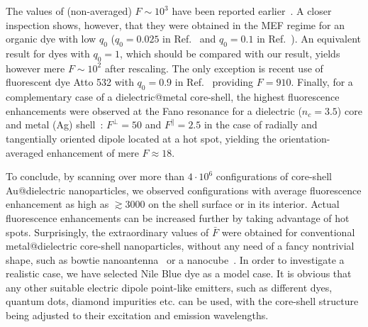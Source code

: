 \documentclass[9pt,twocolumn,twoside]{osajnl}
\begin{document}

The values of (non-averaged) $F\sim 10^3$ have been reported earlier~\cite{Kinkhabwala2009,Hoang2015}.
A closer inspection shows, however, that they were obtained in the MEF regime for an organic dye with low $q_0$ ($q_0 = 0.025$ in Ref.~ and $q_0=0.1$ in Ref.~). 
An equivalent result for dyes with $q_0=1$, which should be compared with our result, yields however mere $F \sim 10^2$ after rescaling. 
The only exception is recent use of fluorescent dye Atto 532 with $q_0=0.9$ in Ref.~ providing $F=910$.
Finally, for a complementary case of a dielectric@metal core-shell, the highest fluorescence enhancements were observed at the Fano resonance for a dielectric ($n_c=3.5$) core and metal (Ag) shell~\cite{Arruda2017a}: $F^\perp=50$ and $F^\parallel=2.5$ in the case of radially and tangentially oriented dipole located at a hot spot, yielding the orientation-averaged enhancement of mere $F\approx 18$.

To conclude, by scanning over more than $4\cdot 10^6$ configurations of core-shell Au@dielectric nanoparticles, we observed configurations with average fluorescence enhancement as high as $\gtrsim 3000$ on the shell surface or in its interior. 
Actual fluorescence enhancements can be increased further by taking advantage of hot spots.
Surprisingly, the extraordinary values of $\bar F$ were obtained for conventional metal@dielectric core-shell nanoparticles, without any need of a fancy nontrivial shape, such as bowtie nanoantenna~\cite{Kinkhabwala2009} or a nanocube~\cite{Hoang2015,Traverso2021}.
In order to investigate a realistic case, we have selected Nile Blue dye as a model case. 
It is obvious that any other suitable electric dipole point-like emitters, such as different dyes, quantum dots, diamond impurities etc. can be used, with the core-shell structure being adjusted to their excitation and emission wavelengths.
\end{document}
